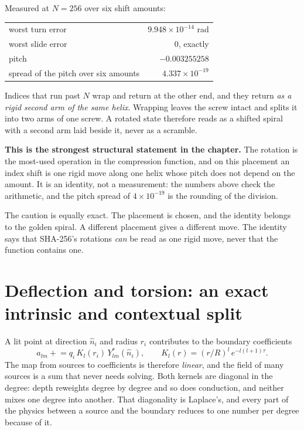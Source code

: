 Measured at \(N = 256\) over six shift amounts:

\begin{center}
\begin{tabular}{lr}
\toprule
worst turn error & \(9.948 \times 10^{-14}\) rad \\
worst slide error & \(0\), exactly \\
pitch & \(-0.003255258\) \\
spread of the pitch over six amounts & \(4.337 \times 10^{-19}\) \\
\bottomrule
\end{tabular}
\end{center}

Indices that run past \(N\) wrap and return at the other end, and they return \emph{as a rigid second arm of the same helix}. Wrapping leaves the screw intact and splits it into two arms of one screw. A rotated state therefore reads as a shifted spiral with a second arm laid beside it, never as a scramble.

\textbf{This is the strongest structural statement in the chapter.} The rotation is the most-used operation in the compression function, and on this placement an index shift is one rigid move along one helix whose pitch does not depend on the amount. It is an identity, not a measurement: the numbers above check the arithmetic, and the pitch spread of \(4 \times 10^{-19}\) is the rounding of the division.

The caution is equally exact. The placement is chosen, and the identity belongs to the golden spiral. A different placement gives a different move. The identity says that SHA-256's rotations \emph{can} be read as one rigid move, never that the function contains one.

\section{Deflection and torsion: an exact intrinsic and contextual split}

A lit point at direction \(\hat n_i\) and radius \(r_i\) contributes to the boundary coefficients
\[
  a_{lm} \mathrel{+}= q_i \, K_l(r_i) \, Y_{lm}^{*}(\hat n_i),
  \qquad
  K_l(r) = (r/R)^{l} \, e^{-l(l+1)\tau}.
\]
The map from sources to coefficients is therefore \emph{linear}, and the field of many sources is a sum that never needs solving. Both kernels are diagonal in the degree: depth reweights degree by degree and so does conduction, and neither mixes one degree into another. That diagonality is Laplace's, and every part of the physics between a source and the boundary reduces to one number per degree because of it.


